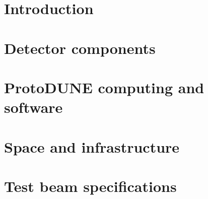 \ifdefined\isfinal\documentclass[final]{pd-tdr}\else\documentclass{pd-tdr}\fi
\begin{document}






\chapter{Introduction}


%

%

\chapter{Detector components} %


\chapter{ProtoDUNE computing and software}


\chapter{Space and infrastructure}


\chapter{Test beam specifications} 


%

%


\cleardoublepage


\end{document}

